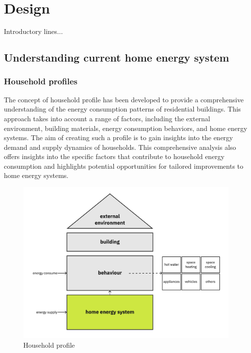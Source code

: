 \chapter{Design} 

Introductory lines...

\section{Understanding current home energy system}


\subsection{Household profiles}

The concept of household profile has been developed to provide a comprehensive understanding of the energy consumption patterns of residential buildings. 
This approach takes into account a range of factors, including the external environment, building materials, energy consumption behaviors, and home energy systems. 
The aim of creating such a profile is to gain insights into the energy demand and supply dynamics of households. 
This comprehensive analysis also offers insights into the specific factors that contribute to household energy consumption and highlights potential opportunities for tailored improvements to home energy systems. 

\begin{figure}[h]
    \centering
    \includegraphics[width=\textwidth]{Images/household_profile.jpg}
    \caption{Household profile}
    \label{fig:profile}
  \end{figure}

